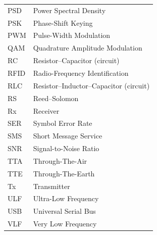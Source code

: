 \documentclass[
	english, %
	letterpaper, oneside
]{book}
\begin{document}
\begin{longtable}{@{}p{} p{}@{}}
PSD    & Power Spectral Density \\
PSK    & Phase-Shift Keying \\
PWM    & Pulse-Width Modulation \\
QAM    & Quadrature Amplitude Modulation \\
RC     & Resistor--Capacitor (circuit) \\
RFID   & Radio-Frequency Identification \\
RLC    & Resistor--Inductor--Capacitor (circuit) \\
RS     & Reed--Solomon \\
Rx     & Receiver \\
SER    & Symbol Error Rate \\
SMS    & Short Message Service \\
SNR    & Signal-to-Noise Ratio \\
TTA    & Through-The-Air \\
TTE    & Through-The-Earth \\
Tx     & Transmitter \\
ULF    & Ultra-Low Frequency \\
USB    & Universal Serial Bus \\
VLF    & Very Low Frequency \\
\end{longtable}


\templateFinalcfg











\end{document}
